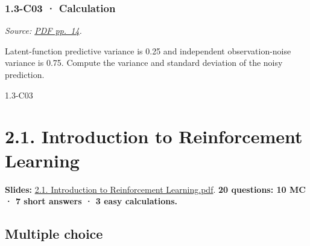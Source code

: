 \noindent\begin{minipage}{\linewidth}

\subsubsection{1.3-C03 · Calculation}\label{c03-calculation-2}

\emph{Source:
\href{../Lecture\%20Slides/1.3.\%20Bayesian\%20Learning.pdf\#page=14}{PDF
pp.~14}.}

Latent-function predictive variance is 0.25 and independent
observation-noise variance is 0.75. Compute the variance and standard
deviation of the noisy prediction.

\begin{solution}[26mm]{1.3-C03}

\end{solution}
\end{minipage}\par\medskip

\clearpage

\section{2.1. Introduction to Reinforcement
Learning}\label{introduction-to-reinforcement-learning}

\textbf{Slides:}
\href{../Lecture\%20Slides/2.1.\%20Introduction\%20to\%20Reinforcement\%20Learning.pdf}{2.1.
Introduction to Reinforcement Learning.pdf}. \textbf{20 questions: 10 MC
· 7 short answers · 3 easy calculations.}

\subsection{Multiple choice}\label{multiple-choice-3}

